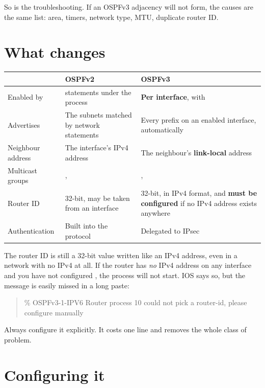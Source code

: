 So is the troubleshooting. If an OSPFv3 adjacency will not form, the causes are
the same list: area, timers, network type, MTU, duplicate router ID.

\section{What changes}

\begin{longtable}{@{}L{3.6cm}L{5.4cm}L{6.2cm}@{}}
\toprule
{}
\textbf{} & \textbf{OSPFv2} & \textbf{OSPFv3} \\
\midrule
\endhead
Enabled by &  statements under the process &
\textbf{Per interface}, with  \\
Advertises & The subnets matched by network statements &
Every prefix on an enabled interface, automatically \\
Neighbour address & The interface's IPv4 address & The neighbour's
\textbf{link-local} address \\
Multicast groups & ,  & ,  \\
Router ID & 32-bit, may be taken from an interface &
32-bit, in IPv4 format, and \textbf{must be configured} if no IPv4 address exists
anywhere \\
Authentication & Built into the protocol & Delegated to IPsec \\
\bottomrule
\end{longtable}

\begin{alertbox}
The router ID is still a 32-bit value written like an IPv4 address, even in a
network with no IPv4 at all. If the router has \emph{no} IPv4 address on any
interface and you have not configured , the process will not
start. IOS says so, but the message is easily missed in a long paste:

\begin{quote}
\RaggedRight\ttfamily\footnotesize \% OSPFv3-1-IPV6 Router process 10 could not
pick a router-id, please configure manually
\end{quote}

Always configure it explicitly. It costs one line and removes the whole class of
problem.
\end{alertbox}

\section{Configuring it}


